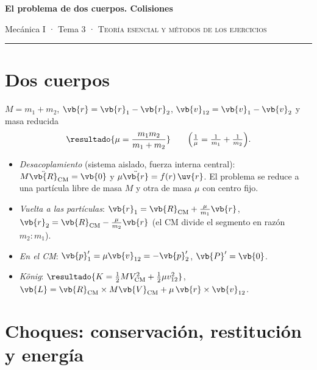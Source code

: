 \documentclass[11pt,a4paper,twoside]{article}
\newcommand{\cm}{_{\mathrm{CM}}}
\newcommand{\Rcm}{\vb{R}\cm}
\newcommand{\Vcm}{\vb{V}\cm}
\newcommand{\vrel}{\vb{v}_{12}}
\begin{document}
\thispagestyle{plain}
\begin{center}
{\Large\bfseries El problema de dos cuerpos. Colisiones\par}
\vspace{1.2mm}
{\small\color{tenue}Mecánica I · Tema 3 · \textsc{Teoría esencial y métodos de los ejercicios}\par}
\vspace{2mm}
{\color{regla}\rule{0.35\textwidth}{0.4pt}}
\end{center}

\section{Dos cuerpos}

$M=m_{1}+m_{2}$, $\vb{r}=\vb{r}_{1}-\vb{r}_{2}$, $\vrel=\vb{v}_{1}-\vb{v}_{2}$ y masa reducida
\[
  \resultado{\mu=\frac{m_{1}m_{2}}{m_{1}+m_{2}}}\qquad\Bigl(\tfrac1\mu=\tfrac1{m_{1}}+\tfrac1{m_{2}}\Bigr).
\]
\begin{itemize}[leftmargin=1.3em]
  \item \emph{Desacoplamiento} (sistema aislado, fuerza interna central): $M\ddot{\vb{R}}\cm=\vb{0}$ y $\mu\ddot{\vb{r}}=f(r)\,\uv{r}$.
        El problema se reduce a una partícula libre de masa $M$ y otra de masa $\mu$ con centro fijo.
  \item \emph{Vuelta a las partículas}: $\vb{r}_{1}=\Rcm+\frac{\mu}{m_{1}}\vb{r}$, $\vb{r}_{2}=\Rcm-\frac{\mu}{m_{2}}\vb{r}$
        (el CM divide el segmento en razón $m_{2}:m_{1}$).
  \item \emph{En el CM}: $\vb{p}_{1}'=\mu\vrel=-\vb{p}_{2}'$, $\vb{P}'=\vb{0}$.
  \item \emph{König}: $\resultado{K=\tfrac12MV\cm^{2}+\tfrac12\mu v_{12}^{2}}$, $\vb{L}=\Rcm\times M\Vcm+\mu\,\vb{r}\times\vrel$.
\end{itemize}

\section{Choques: conservación, restitución y energía}
\end{document}
